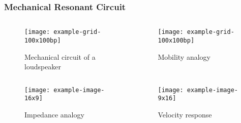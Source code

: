 \documentclass{beamer}
\begin{document}
\begin{frame}
    \frametitle{Mechanical Resonant Circuit}
    \begin{columns}[T]
        \begin{column}{.45\textwidth}
            \begin{figure}
                \texttt{[image: example-grid-100x100bp]} 
                \caption{Mechanical circuit of a loudspeaker}
            \end{figure}
        \end{column}
        \pause
        \begin{column}{.45\textwidth}
            \begin{figure}
                \texttt{[image: example-grid-100x100bp]} 
                \caption{Mobility analogy}
            \end{figure}
        \end{column}        
    \end{columns}
    \pause
    \vfill
    \begin{columns}[T]
        \begin{column}{.45\textwidth}
            \begin{figure}
                \texttt{[image: example-image-16x9]} 
                \caption{Impedance analogy}
            \end{figure}
        \end{column}
        \pause
        \begin{column}{.45\textwidth}
            \begin{figure}
                \texttt{[image: example-image-9x16]} 
                \caption{Velocity response}
            \end{figure}
        \end{column}        
    \end{columns}
\end{frame}
\end{document}
